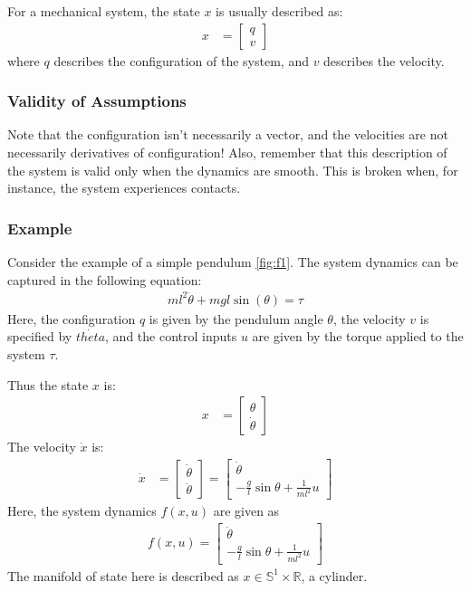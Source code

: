 \noindent
For a mechanical system, the state $x$ is usually described as:
\begin{align}
    x &= \begin{bmatrix}
            q \\
            v
        \end{bmatrix}
\end{align}
where $q$ describes the configuration of the system, and $v$ describes the velocity. 

\subsubsection{Validity of Assumptions}
Note that the configuration isn't necessarily a vector, and the velocities are not necessarily derivatives of configuration! Also, remember that this description of the system is valid only when the dynamics are smooth. This is broken when, for instance, the system experiences contacts. 

\subsubsection{Example}
Consider the example of a simple pendulum \cref{fig:f1}. The system dynamics can be captured in the following equation: 
\begin{align}
    m l^2 \ddot{\theta} + m g l \sin(\theta) = \tau
\end{align}
Here, the configuration $q$ is given by the pendulum angle $\theta$, the velocity $v$ is specified by $\dot{theta}$, and the control inputs $u$ are given by the torque applied to the system $\tau$.

\noindent
Thus the state $x$ is: 
\begin{align}
    x &= \begin{bmatrix}
            \theta \\
            \dot{\theta} 
        \end{bmatrix}
\end{align} 
The velocity $\dot{x}$ is:
\begin{align}
    \dot{x} &= \begin{bmatrix} 
            \dot{\theta}  \\
            \ddot{\theta} 
        \end{bmatrix}
        = 
        \begin{bmatrix}
            \dot{\theta} \\
            -\frac{g}{l} \sin{\theta} + \frac{1}{m l^2} u
        \end{bmatrix}
\end{align} 
Here, the system dynamics $f(x,u)$ are given as 
\begin{align}
    f(x,u) = 
        \begin{bmatrix}
            \dot{\theta} \\
            -\frac{g}{l} \sin{\theta} + \frac{1}{m l^2} u
        \end{bmatrix}
\end{align} 
The manifold of state here is described as $x \in \mathbb{S}^1 \times \mathbb{R}$, a cylinder.

